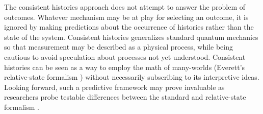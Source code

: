 The consistent histories approach does not attempt to answer the problem of outcomes. Whatever mechanism may be at play for selecting an  outcome, it is ignored by making predictions about the occurrence of histories rather than the state of the system. Consistent histories generalizes standard quantum mechanics so that measurement may be described as a physical process, while being cautious to avoid speculation about processes not yet understood. Consistent histories can be seen as a way to employ the math of many-worlds (Everett's relative-state formalism \cite{everett}) without necessarily subscribing to its interpretive ideas. Looking forward, such a predictive framework may prove invaluable as researchers probe testable differences between the standard and relative-state formalism \cite{baumann, proietti}.

%
%
%
%
%
%
